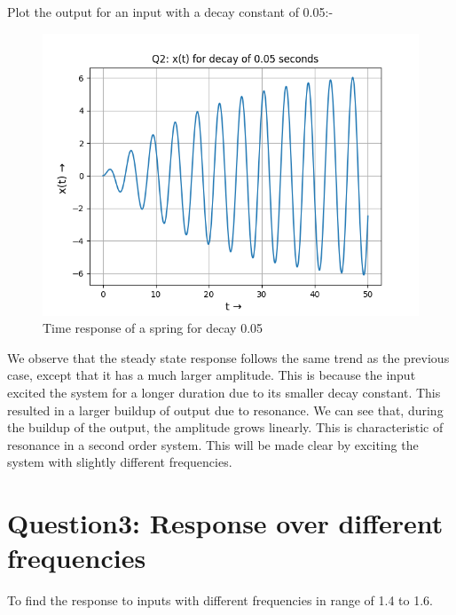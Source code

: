 \documentclass[11pt, a4paper]{article}
\begin{document}
Plot the output for an input with a decay constant of 0.05:-  
\begin{figure}[!tbh]
 \centering
 \includegraphics[scale=0.6]{Ass6_Figure_1.png}  
 \caption{Time response of a spring for decay 0.05}
\end{figure}

We observe that the steady state response follows the same trend as the previous case, except that it has a much larger amplitude.   This is because the input excited the system for a longer duration due to its smaller decay constant.   This resulted in a larger buildup of output due to resonance.  We can see that, during the buildup of the output, the amplitude grows linearly.  This is characteristic of resonance in a second order system.  This will be made clear by exciting the system with slightly different frequencies.

\section{Question3: Response over different frequencies }
To find the response to inputs with different frequencies in range of 1.4 to 1.6.
\end{document}
